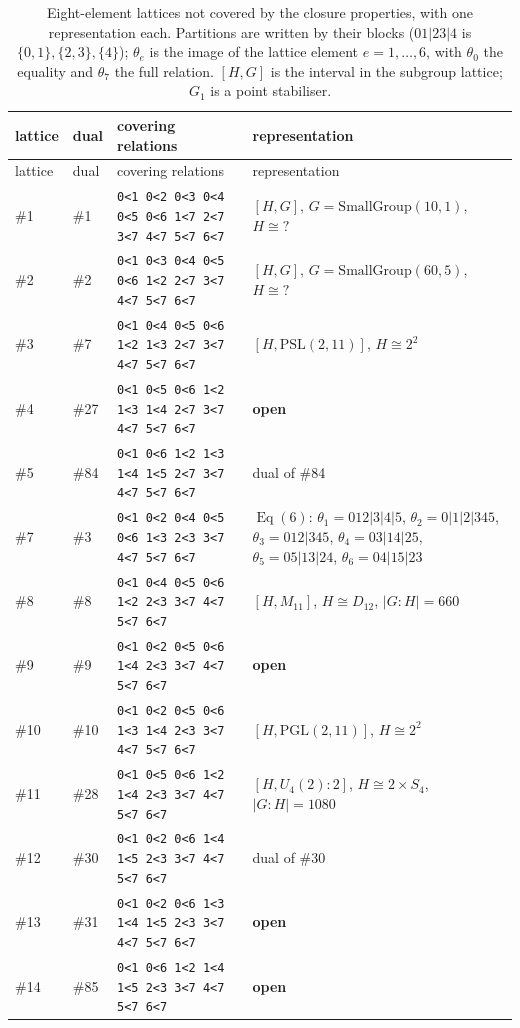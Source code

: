 \documentclass[11pt]{article}
\theoremstyle{remark}
\newcommand{\Eq}{\operatorname{Eq}}
\begin{document}
{\small
\begin{longtable}{@{}l l p{4.9cm} p{7.4cm}@{}}
\caption{Eight-element lattices not covered by the closure properties, with one representation
each. Partitions are written by their blocks ($01|23|4$ is $\{0,1\},\{2,3\},\{4\}$); $\theta_e$ is
the image of the lattice element $e=1,\dots,6$, with $\theta_0$ the equality and $\theta_7$ the full
relation. $[H,G]$ is the interval in the subgroup lattice; $G_1$ is a point stabiliser.}
\label{tab:wit}\\
\toprule
lattice & dual & covering relations & representation\\
\midrule
\endfirsthead
\toprule
lattice & dual & covering relations & representation\\
\midrule
\endhead
\#1 & \#1 & \texttt{0<1 0<2 0<3 0<4 0<5 0<6 1<7 2<7 3<7 4<7 5<7 6<7} & $[H,G]$, $G=\mathrm{SmallGroup}(10,1)$, $H\cong ?$\\
\#2 & \#2 & \texttt{0<1 0<3 0<4 0<5 0<6 1<2 2<7 3<7 4<7 5<7 6<7} & $[H,G]$, $G=\mathrm{SmallGroup}(60,5)$, $H\cong ?$\\
\#3 & \#7 & \texttt{0<1 0<4 0<5 0<6 1<2 1<3 2<7 3<7 4<7 5<7 6<7} & $[H,\mathrm{PSL}(2,11)]$, $H\cong 2^2$\\
\#4 & \#27 & \texttt{0<1 0<5 0<6 1<2 1<3 1<4 2<7 3<7 4<7 5<7 6<7} & \textbf{open}\\
\#5 & \#84 & \texttt{0<1 0<6 1<2 1<3 1<4 1<5 2<7 3<7 4<7 5<7 6<7} & dual of \#84\\
\#7 & \#3 & \texttt{0<1 0<2 0<4 0<5 0<6 1<3 2<3 3<7 4<7 5<7 6<7} & $\Eq(6)$: $\theta_1=012|3|4|5$, $\theta_2=0|1|2|345$, $\theta_3=012|345$, $\theta_4=03|14|25$, $\theta_5=05|13|24$, $\theta_6=04|15|23$\\
\#8 & \#8 & \texttt{0<1 0<4 0<5 0<6 1<2 2<3 3<7 4<7 5<7 6<7} & $[H,M_{11}]$, $H\cong D_{12}$, $|G:H|=660$\\
\#9 & \#9 & \texttt{0<1 0<2 0<5 0<6 1<4 2<3 3<7 4<7 5<7 6<7} & \textbf{open}\\
\#10 & \#10 & \texttt{0<1 0<2 0<5 0<6 1<3 1<4 2<3 3<7 4<7 5<7 6<7} & $[H,\mathrm{PGL}(2,11)]$, $H\cong 2^2$\\
\#11 & \#28 & \texttt{0<1 0<5 0<6 1<2 1<4 2<3 3<7 4<7 5<7 6<7} & $[H,U_4(2){:}2]$, $H\cong 2\times S_{4}$, $|G:H|=1080$\\
\#12 & \#30 & \texttt{0<1 0<2 0<6 1<4 1<5 2<3 3<7 4<7 5<7 6<7} & dual of \#30\\
\#13 & \#31 & \texttt{0<1 0<2 0<6 1<3 1<4 1<5 2<3 3<7 4<7 5<7 6<7} & \textbf{open}\\
\#14 & \#85 & \texttt{0<1 0<6 1<2 1<4 1<5 2<3 3<7 4<7 5<7 6<7} & \textbf{open}\\

\end{longtable}}
\end{document}
